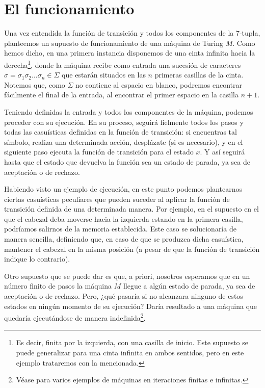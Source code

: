 \section{El funcionamiento}

Una vez entendida la función de transición y todos los componentes de la 7-tupla, planteemos un supuesto de funcionamiento de una máquina de Turing $M$. Como hemos dicho, en una primera instancia
disponemos de una cinta infinita hacia la derecha\footnote{Es decir, finita por la izquierda, con una casilla de inicio. Este supuesto se puede generalizar para una cinta infinita en ambos sentidos, pero en este
ejemplo trataremos con la mencionada.}, donde la máquina recibe como entrada una sucesión de caracteres $\sigma = \sigma_1 \sigma_2 \dots \sigma_n \in \Sigma$ que estarán situados en las $n$ primeras casillas de 
la cinta. Notemos que, como $\Sigma$ no contiene al espacio en blanco, podremos encontrar fácilmente el final de la entrada, al encontrar el primer espacio en la casilla $n+1$.

Teniendo definidas la entrada y todos los componentes de la máquina, podemos proceder con su ejecución. En su proceso, seguirá fielmente todos los pasos y todas las casuísticas definidas en la función de transición:
si encuentras tal símbolo, realiza una determinada acción, desplázate (si es necesario), y en el siguiente paso ejecuta la función de transición para el estado $x$. Y así seguirá hasta que el estado que devuelva
la función sea un estado de parada, ya sea de aceptación o de rechazo.

Habiendo visto un ejemplo de ejecución, en este punto podemos plantearnos ciertas casuísticas peculiares que pueden suceder al aplicar la función de transición definida de una determinada manera. Por ejemplo, en el 
supuesto en el que el cabezal deba moverse hacia la izquierda estando en la primera casilla, podríamos salirnos de la memoria establecida. Este caso se solucionaría de manera sencilla, definiendo que, en caso de que se 
produzca dicha casuística, mantener el cabezal en la misma posición (a pesar de que la función de transición indique lo contrario).

Otro supuesto que se puede dar es que, a priori, nosotros esperamos que en un número finito de pasos la máquina $M$ llegue a algún estado de parada, ya sea de aceptación o de rechazo. Pero, ¿qué pasaría si no alcanzara
ninguno de estos estados en ningún momento de su ejecución? Daría resultado a una máquina que quedaría ejecutándose de manera indefinida\footnote{Véase \cite{sipser2006introduction} para varios ejemplos de máquinas en 
iteraciones finitas e infinitas.}.


